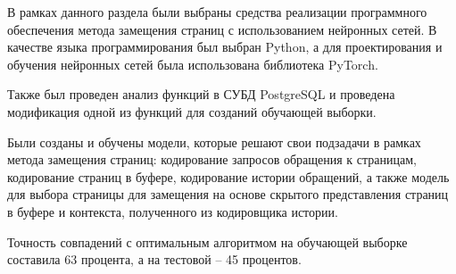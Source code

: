 В рамках данного раздела были выбраны средства реализации программного обеспечения метода замещения страниц с использованием нейронных сетей.
В качестве языка программирования был выбран Python, а для проектирования и обучения нейронных сетей была использована библиотека PyTorch. 

Также был проведен анализ функций в СУБД PostgreSQL и проведена модификация одной из функций для созданий обучающей выборки.

Были созданы и обучены модели, которые решают свои подзадачи в рамках метода замещения страниц: кодирование запросов обращения к страницам, кодирование страниц в буфере, кодирование истории обращений, а также модель для выбора страницы для замещения на основе скрытого представления страниц в буфере и контекста, полученного из кодировщика истории.

Точность совпадений с оптимальным алгоритмом на обучающей выборке составила 63 процента, а на тестовой -- 45 процентов.